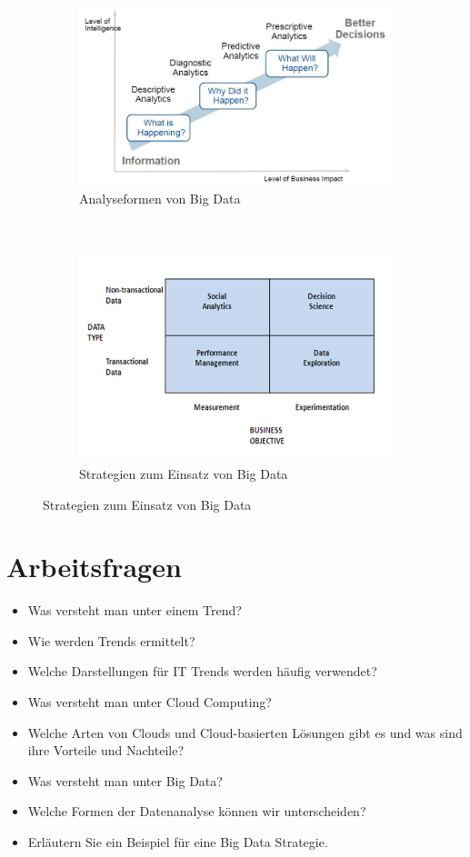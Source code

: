 \begin{figure}[h!]
	\centering
	\begin{subfigure}[h!]{0.4\textwidth}
		\includegraphics[width=\textwidth]{fig/analyseformen}
		\caption{Analyseformen von Big Data}
		\label{fig:analyseformen}
	\end{subfigure}
	~
	\begin{subfigure}[h!]{0.4\textwidth}
		\includegraphics[width=\textwidth]{fig/strategy_bigdata}
		\caption{Strategien zum Einsatz von Big Data}
		\label{fig:strategy_bigdata}
	\end{subfigure}
\end{figure}


\section{Arbeitsfragen}
\begin{itemize}
	\item Was versteht man unter einem Trend?
	\item Wie werden Trends ermittelt?
	\item Welche Darstellungen für IT Trends werden häufig verwendet?
	\item Was versteht man unter Cloud Computing?
	\item Welche Arten von Clouds und Cloud-basierten Lösungen gibt es und was sind ihre Vorteile und Nachteile?
	\item Was versteht man unter Big Data?
	\item Welche Formen der Datenanalyse können wir	unterscheiden?
	\item Erläutern Sie ein Beispiel für eine Big Data Strategie.
\end{itemize}

